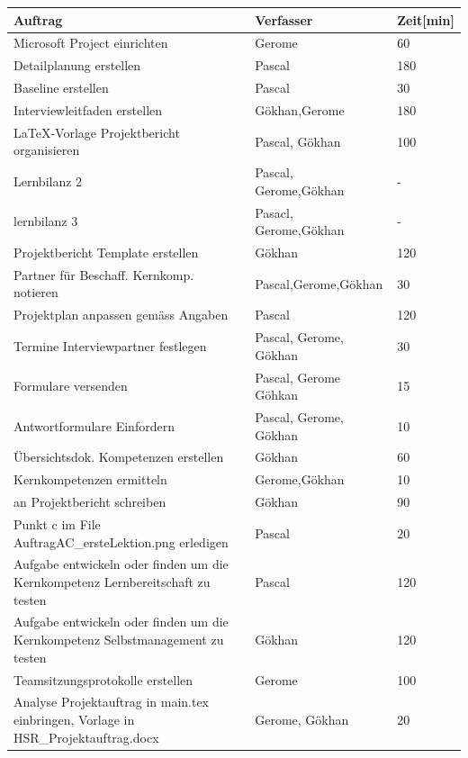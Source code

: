  \begin{longtable}{ | p{7cm} | p{4cm} | p{2cm} |}
   \hline
   \textbf{Auftrag} & \textbf{Verfasser} & \textbf{Zeit[min]}   \\
   \hline  		
    Microsoft Project einrichten & Gerome & 60 \\ \hline
    Detailplanung erstellen & Pascal & 180 \\ \hline
    Baseline erstellen  & Pascal & 30 \\ \hline
    Interviewleitfaden erstellen& Gökhan,Gerome & 180 \\ \hline
    LaTeX-Vorlage Projektbericht organisieren & Pascal, Gökhan & 100 \\ \hline
    Lernbilanz 2 & Pascal, Gerome,Gökhan & - \\ \hline
    lernbilanz 3 & Pasacl, Gerome,Gökhan & - \\ \hline
    Projektbericht Template erstellen & Gökhan & 120 \\ \hline
    Partner für Beschaff. Kernkomp. notieren & Pascal,Gerome,Gökhan & 30 \\ \hline
    Projektplan anpassen gemäss Angaben & Pascal & 120 \\ \hline
    Termine Interviewpartner festlegen & Pascal, Gerome, Gökhan & 30 \\ \hline
    Formulare versenden & Pascal, Gerome Göhkan & 15 \\ \hline
    Antwortformulare Einfordern & Pascal, Gerome, Gökhan & 10 \\ \hline
    Übersichtsdok. Kompetenzen erstellen & Gökhan & 60 \\ \hline    
    Kernkompetenzen ermitteln & Gerome,Gökhan & 10 \\ \hline   
    an Projektbericht schreiben & Gökhan & 90 \\ \hline   
    Punkt c im File AuftragAC\_ersteLektion.png erledigen & Pascal & 20 \\ \hline    
    Aufgabe entwickeln oder finden um die Kernkompetenz Lernbereitschaft zu testen  & Pascal & 120 \\ \hline   
    Aufgabe entwickeln oder finden um die Kernkompetenz Selbstmanagement zu testen  & Gökhan & 120 \\ \hline  
    Teamsitzungsprotokolle erstellen & Gerome & 100 \\ \hline    
    Analyse Projektauftrag in main.tex einbringen, Vorlage in HSR\_Projektauftrag.docx & Gerome, Gökhan & 20\\ \hline   

\end{longtable}

